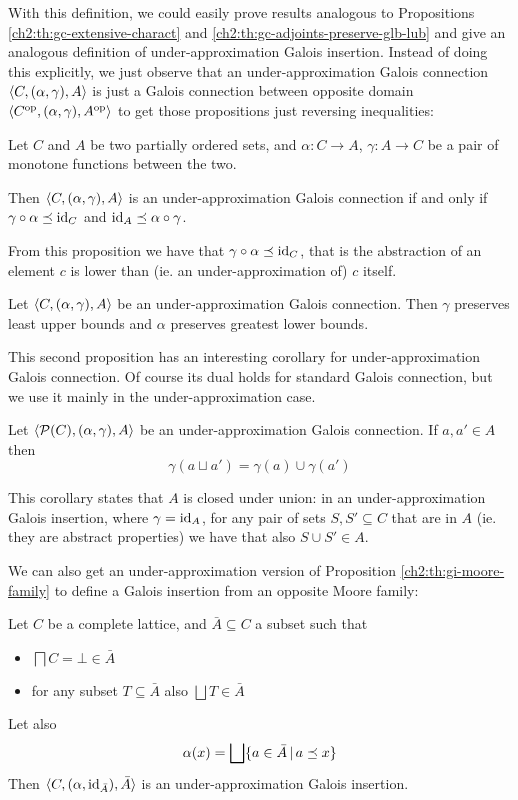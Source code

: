With this definition, we could easily prove results analogous to Propositions \ref{ch2:th:gc-extensive-charact} and \ref{ch2:th:gc-adjoints-preserve-glb-lub} and give an analogous definition of under-approximation Galois insertion.
Instead of doing this explicitly, we just observe that an under-approximation Galois connection $\langle C, (\alpha, \gamma), A \rangle$ is just a Galois connection between opposite domain $\langle C^{\text{op}}, (\alpha, \gamma), A^{\text{op}} \rangle$ to get those propositions just reversing inequalities:
\begin{prop}\label{ch2:th:under-gc-extensive-charact}
	Let $C$ and $A$ be two partially ordered sets, and $\alpha : C \rightarrow A$, $\gamma : A \rightarrow C$ be a pair of monotone functions between the two.

	Then $\langle C, (\alpha, \gamma), A \rangle$ is an under-approximation Galois connection if and only if $\gamma \circ \alpha \preceq \text{id}_C$ and $\text{id}_A \preceq \alpha \circ \gamma$.
\end{prop}
From this proposition we have that $\gamma \circ \alpha \preceq \text{id}_C$, that is the abstraction of an element $c$ is lower than (ie. an under-approximation of) $c$ itself.

\begin{prop}\label{ch2:th:under-gc-adjoints-preserve-lub-glb}
	Let $\langle C, (\alpha, \gamma), A \rangle$ be an under-approximation Galois connection. Then $\gamma$ preserves least upper bounds and $\alpha$ preserves greatest lower bounds.
\end{prop}

This second proposition has an interesting corollary for under-approximation Galois connection. Of course its dual holds for standard Galois connection, but we use it mainly in the under-approximation case.
\begin{corollary}\label{ch2:th:under-gc-union-closure}
	Let $\langle \mathcal{P}(C), (\alpha, \gamma), A \rangle$ be an under-approximation Galois connection. If $a, a' \in A$ then
	\[
	\gamma(a \sqcup a') = \gamma(a) \cup \gamma(a')
	\]
\end{corollary}

This corollary states that $A$ is closed under union: in an under-approximation Galois insertion, where $\gamma = \text{id}_A$, for any pair of sets $S, S' \subseteq C$ that are in $A$ (ie. they are abstract properties) we have that also $S \cup S' \in A$.

We can also get an under-approximation version of Proposition \ref{ch2:th:gi-moore-family} to define a Galois insertion from an opposite Moore family:
\begin{prop}\label{ch2:th:under-gi-moore-family}
	Let $C$ be a complete lattice, and $\bar{A} \subseteq C$ a subset such that
	\begin{itemize}
		\item $\bigsqcap C = \bot \in \bar{A}$
		\item for any subset $T \subseteq \bar{A}$ also $\bigsqcup T \in \bar{A}$
	\end{itemize}
	Let also
	\[
	\alpha(x) = \bigsqcup \{ a \in \bar{A} \,\vert\, a \preceq x \}
	\]
	Then $\langle C, (\alpha, \text{id}_{\bar{A}}), \bar{A} \rangle$ is an under-approximation Galois insertion.
\end{prop}


